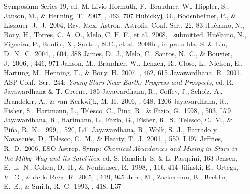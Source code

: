 \documentclass[11pt,twoside]{book}
\begin{document}
\begin{thebibliography}{}
Symposium Series 19, ed. M. Livio
Hormuth, F., Brandner, W., Hippler, S., Janson, M., \& Henning, T.\ 2007, \aap,
463, 707
Hubickyj, O., Bodenheimer, P., \& Lissauer, J.~J.\ 2004, Rev. Mex. Astron.
Astrofis. Conf. Ser., 22, 83
Hu{\'e}lamo, N., Bouy, H., Torres, C. A. O., Melo, C. H. F., et al.\ 2008,
\aap  ~submitted.
Hu{\'e}lamo, N., Figueira, P., Bonfils, X., Santos, N.C., et al.\ 2008b
\aap, in press
Ida, S. \& Lin, D.~N.~C.\ 2004, \apj, 604, 388
James, D.~J., Melo, C., Santos, N.~C., \& Bouvier, J.\ 2006, \aap, 446, 971
Janson, M., Brandner, W., Lenzen, R., Close, L., Nielsen, E., Hartung, M.,
Henning, T., \& Bouy, H.\ 2007, \aap, 462, 615
Jayawardhana, R.\ 2001, ASP Conf.~Ser.~244: {\it Young Stars Near Earth:
Progress and Prospects}, ed. R. {Jayawardhana} \& T. {Greene},  185
Jayawardhana, R., Coffey, J.,  Scholz, A.,  Brandeker, A., \& van  Kerkwijk, M.
H.\ 2006, \apj, 648, 1206
Jayawardhana, R., Fisher, S., Hartmann, L., Telesco, C., Pina, R., \& Fazio, G.\
1998, \apjl, 503, L79
Jayawardhana, R., Hartmann, L., Fazio, G., Fisher, R.~S., Telesco, C.~M., \&
Pi{\~n}a, R.~K.\ 1999, \apjl, 520, L41
Jayawardhana, R., Wolk, S.~J., Barrado y Navascu{\'e}s, D., Telesco, C.~M., \&
Hearty, T.~J.\ 2001, \apjl, 550, L197
Jeffries, R.~D.\ 2006, ESO Astrop. Symp:
{\it Chemical Abundances and Mixing in Stars in the Milky Way and its  Satellites},
ed. S. Randich, S. \&  L. Pasquini, 163
Jensen, E.~L.~N., Cohen, D.~H., \& Neuh{\"a}user, R.\ 1998, \aj, 116, 414
\bibitem[Jilinski et al.(2005)]{jilinski05}
Jilinski, E., Ortega, V.~G., \& de la Reza, R.\ 2005, \apj, 619, 945
\bibitem[Jura et al.(1993)]{jura93}
Jura, M., Zuckerman, B., Becklin, E.~E., \& Smith, R.~C.\ 1993, \apjl, 418, L37

\end{thebibliography}
\end{document}
